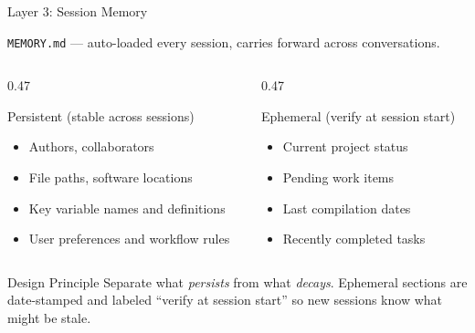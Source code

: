 \documentclass[aspectratio=169,11pt]{beamer}
\begin{document}
\begin{frame}{Layer 3: Session Memory}

\texttt{MEMORY.md} --- auto-loaded every session, carries forward across conversations.

\bigskip

\begin{columns}[T]
\begin{column}{0.47\textwidth}

\begin{block}{Persistent (stable across sessions)}
\begin{itemize}\small
  \item Authors, collaborators
  \item File paths, software locations
  \item Key variable names and definitions
  \item User preferences and workflow rules
\end{itemize}
\end{block}

\end{column}
\begin{column}{0.47\textwidth}

\begin{alertblock}{Ephemeral (verify at session start)}
\begin{itemize}\small
  \item Current project status
  \item Pending work items
  \item Last compilation dates
  \item Recently completed tasks
\end{itemize}
\end{alertblock}

\end{column}
\end{columns}

\bigskip

\begin{exampleblock}{Design Principle}
Separate what \textit{persists} from what \textit{decays}. Ephemeral sections are date-stamped and labeled ``verify at session start'' so new sessions know what might be stale.
\end{exampleblock}

\end{frame}
\end{document}
